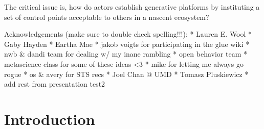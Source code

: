 \documentclass[11pt]{article}
\begin{document}
\begin{leftbar}
The critical issue is, how do actors establish generative platforms by
instituting a set of control points acceptable to others in a nascent
ecosystem? \cite{tilsonDigitalInfrastructuresMissing2010} 
\end{leftbar}

Acknowledgements (make sure to double check spelling!!!): * Lauren E.
Wool * Gaby Hayden * Eartha Mae * jakob voigts for participating in the
glue wiki * nwb \& dandi team for dealing w/ my inane rambling * open
behavior team * metascience class for some of these ideas \textless3 *
mike for letting me always go rogue * os \& avery for STS recs * Joel
Chan @ UMD * Tomasz Pluskiewicz * add rest from presentation test2

\hypertarget{introduction}{%
\section{Introduction}\label{introduction}}
\end{document}
